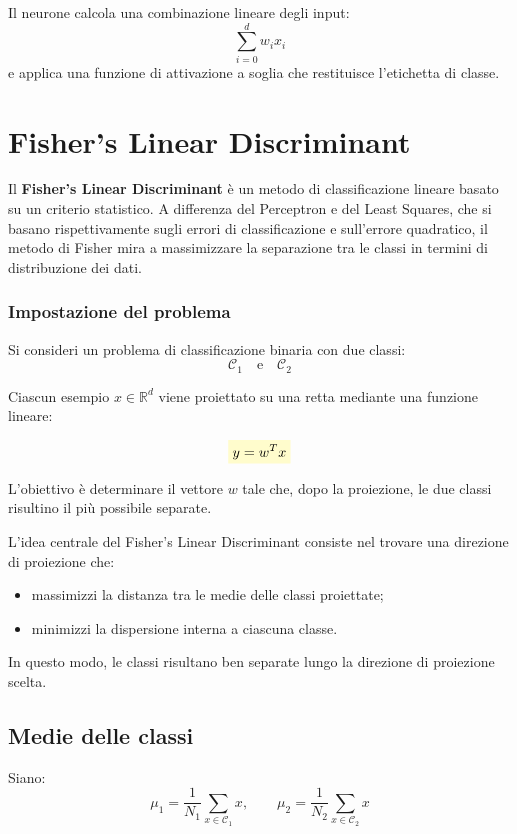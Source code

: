 \documentclass[a4paper,12pt]{report}
\newcommand{\highlight}[1]{%
\colorbox{yellow!20}{$\displaystyle #1$}%
}
\begin{document}
Il neurone calcola una combinazione lineare degli input:
\[
\sum_{i=0}^{d} w_i x_i
\]
e applica una funzione di attivazione a soglia che restituisce l’etichetta di classe.

\section{Fisher's Linear Discriminant}

Il \textbf{Fisher’s Linear Discriminant} è un metodo di classificazione lineare basato su un criterio statistico.
A differenza del Perceptron e del Least Squares, che si basano rispettivamente sugli errori di classificazione e sull’errore quadratico, il metodo di Fisher mira a massimizzare la separazione tra le classi in termini di distribuzione dei dati.

\subsubsection{Impostazione del problema}

Si consideri un problema di classificazione binaria con due classi:
\[
\mathcal{C}_1 \quad \text{e} \quad \mathcal{C}_2
\]

Ciascun esempio \( x \in \mathbb{R}^d \) viene proiettato su una retta mediante una funzione lineare:

\[
\highlight{
y = w^T x}
\]

L’obiettivo è determinare il vettore \( w \) tale che, dopo la proiezione, le due classi risultino il più possibile separate.

L’idea centrale del Fisher’s Linear Discriminant consiste nel trovare una direzione di proiezione che:
\begin{itemize}
    \item massimizzi la distanza tra le medie delle classi proiettate;
    \item minimizzi la dispersione interna a ciascuna classe.
\end{itemize}

In questo modo, le classi risultano ben separate lungo la direzione di proiezione scelta.

\subsection{Medie delle classi}

Siano:
\[
\mu_1 = \frac{1}{N_1} \sum_{x \in \mathcal{C}_1} x,
\qquad
\mu_2 = \frac{1}{N_2} \sum_{x \in \mathcal{C}_2} x
\]
\end{document}
